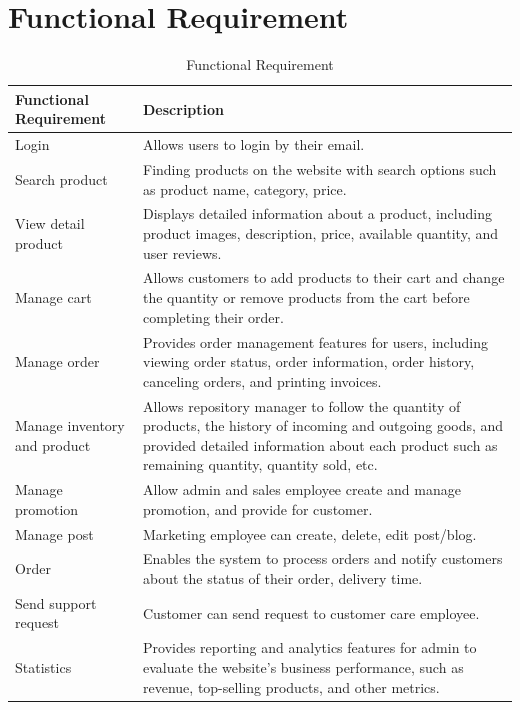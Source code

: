 
\section{Functional Requirement}
\begin{table}[h]
\begin{tabular}{|>{\raggedright\arraybackslash}p{5cm}|>{\raggedright\arraybackslash}p{10cm}|}
\hline
\textbf{Functional Requirement}& \textbf{Description }\\
\hline
Login& Allows users to login by their email.\\
\hline
Search product& Finding products on the website with search options such as product name, category, price.\\
\hline
View detail product& Displays detailed information about a product, including product images, description, price, available quantity, and user reviews.\\
\hline
Manage cart& Allows customers to add products to their cart and change the quantity or remove products from the cart before completing their order.\\
\hline
Manage order& Provides order management features for users, including viewing order status, order information, order history, canceling orders, and printing invoices.\\
\hline
Manage inventory and product& Allows repository manager to follow the quantity of products, the history of incoming and outgoing goods, and provided detailed information about each product such as remaining quantity, quantity sold, etc.\\
\hline
Manage promotion & Allow admin and sales employee create and manage promotion, and provide for customer.\\
\hline
Manage post & Marketing employee can create, delete, edit post/blog. \\
\hline
Order & Enables the system to process orders and notify customers about the status of their order, delivery time.\\
\hline
Send support request & Customer can send request to customer care employee.\\
\hline
Statistics& Provides reporting and analytics features for admin to evaluate the website's business performance, such as revenue, top-selling products, and other metrics.\\
\hline
\end{tabular}
\caption{Functional Requirement}
\label{tab:Functional }
\end{table}
